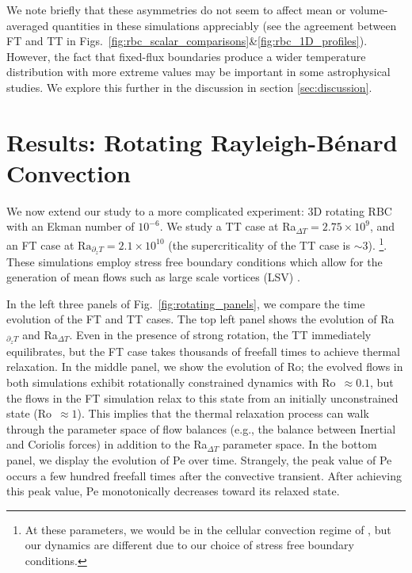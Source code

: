 \documentclass[aps, pre, onecolumn, nofootinbib, notitlepage, groupedaddress, amsfonts, amssymb, amsmath, longbibliography, superscriptaddress]{revtex4-1}
\newcommand{\RB}{Rayleigh-B\'{e}nard }
\newcommand{\ea}[1]{{\color{red} #1}}
\begin{document}
We note briefly that these asymmetries do not seem to affect mean or volume-averaged quantities in these simulations appreciably (see the agreement between FT and TT in Figs.~\ref{fig:rbc_scalar_comparisons}\&\ref{fig:rbc_1D_profiles}).
However, the fact that fixed-flux boundaries produce a wider temperature distribution with more extreme values may be important in some astrophysical studies.
We explore this further in the discussion in section \ref{sec:discussion}.





\section{Results: Rotating \RB Convection}
\label{sec:results_rotating}

We now extend our study to a more complicated experiment: 3D rotating RBC with an Ekman number of $10^{-6}$.
We study a TT case at Ra$_{\Delta T} = 2.75\times 10^9$, and an FT case at $\text{Ra}_{\partial_z T} = 2.1 \times 10^{10}$ (the supercriticality of the TT case is $\sim 3$).
\footnote{\ea{At these parameters, we would be in the cellular convection regime of \citet{stellmach&all2014}, but our dynamics are different due to our choice of stress free boundary conditions.
}}.
These simulations employ stress free boundary conditions which allow for the generation of mean flows such as large scale vortices (LSV) \ea{\citep{stellmach&all2014, rubio&all2014, guervilly&all2014, guervilly&hughes2017, favier&all2014, favier&all2019, couston&all2019}}.

In the left three panels of Fig.~\ref{fig:rotating_panels}, we compare the time evolution of the FT and TT cases.
The top left panel shows the evolution of Ra$_{\partial_z T}$ and Ra$_{\Delta T}$.
Even in the presence of strong rotation, the TT immediately equilibrates, but the FT case takes thousands of freefall times to achieve thermal relaxation.
In the middle panel, we show the evolution of Ro; the evolved flows in both simulations exhibit rotationally constrained dynamics with Ro $\,\approx 0.1$, but the flows in the FT simulation relax to this state from an initially unconstrained state (Ro $\,\approx 1$).
This implies that the thermal relaxation process can walk through the parameter space of flow balances (e.g., the balance between Inertial and Coriolis forces) in addition to the Ra$_{\Delta T}$ parameter space.
In the bottom panel, we display the evolution of Pe over time.
Strangely, the peak value of Pe occurs a few hundred freefall times after the convective transient.
After achieving this peak value, Pe monotonically decreases toward its relaxed state.
\end{document}
